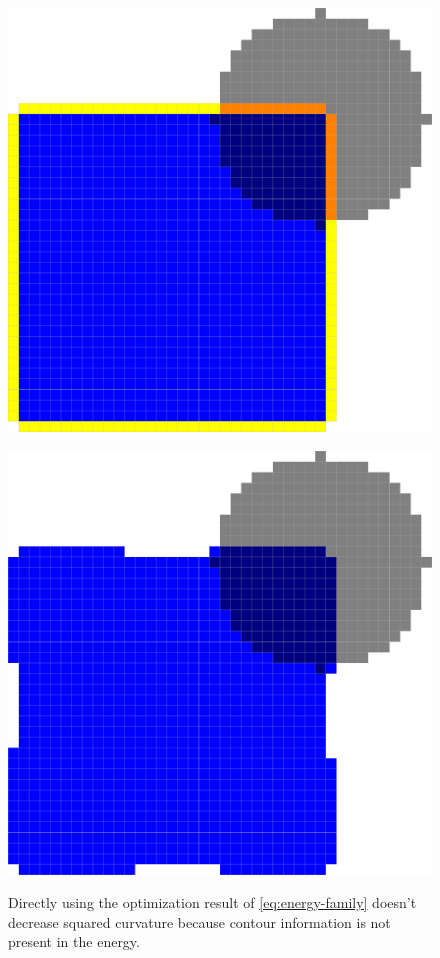 \begin{figure}
\begin{minipage}{0.5\textwidth}
\center
\includegraphics[scale=0.2]{figures/chapter6/contour-information/before-opt.pdf}
\label{fig:contour-info-1}
\end{minipage}%
\begin{minipage}{0.5\textwidth}
\center
\includegraphics[scale=0.2]{figures/chapter6/contour-information/after-opt.pdf}
\label{fig:contour-info-2}
\end{minipage}%
\caption{ Directly using the optimization result of \eqref{eq:energy-family} doesn't decrease squared curvature because contour information is not present in the energy.}
\label{fig:contour-info}
\end{figure}

